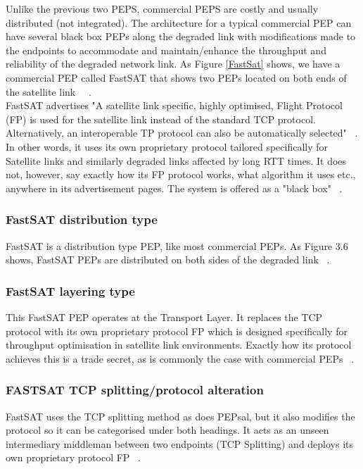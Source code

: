 Unlike the previous two PEPS, commercial PEPS are costly and usually distributed (not integrated). The architecture for a typical commercial PEP can have several black box PEPs along the degraded link with modifications made to the endpoints to accommodate and maintain/enhance the throughput and reliability of the degraded network link. As Figure \ref{FastSat} shows, we have a commercial PEP called FastSAT that shows two PEPs located on both ends of the satellite link ~\cite{6}~\cite{34}. \\

FastSAT advertises "A satellite link specific, highly optimised, Flight Protocol (FP) is used for the satellite link instead of the standard TCP protocol. Alternatively, an interoperable TP protocol can also be automatically selected" ~\cite{34}. \\

In other words, it uses its own proprietary protocol tailored specifically for Satellite links and similarly degraded links affected by long RTT times. It does not, however, say exactly how its FP protocol works, what algorithm it uses etc., anywhere in its advertisement pages. The system is offered as a "black box" ~\cite{34}. \\

\subsubsection*{FastSAT distribution type}
FastSAT is a distribution type PEP, like most commercial PEPs.  As Figure 3.6 shows, FastSAT PEPs are distributed on both sides of the degraded link ~\cite{34}.

\subsubsection*{FastSAT layering type}
This FastSAT PEP operates at the Transport Layer. It replaces the TCP protocol with its own proprietary protocol FP which is designed specifically for throughput optimisation in satellite link environments. Exactly how its protocol achieves this is a trade secret, as is commonly the case with commercial PEPs ~\cite{34}. 

\subsubsection*{FASTSAT TCP splitting/protocol alteration}
FastSAT uses the TCP splitting method as does PEPsal, but it also modifies the protocol so it can be categorised under both headings. It acts as an unseen intermediary middleman between two endpoints (TCP Splitting) and deploys its own proprietary protocol FP ~\cite{34}.

